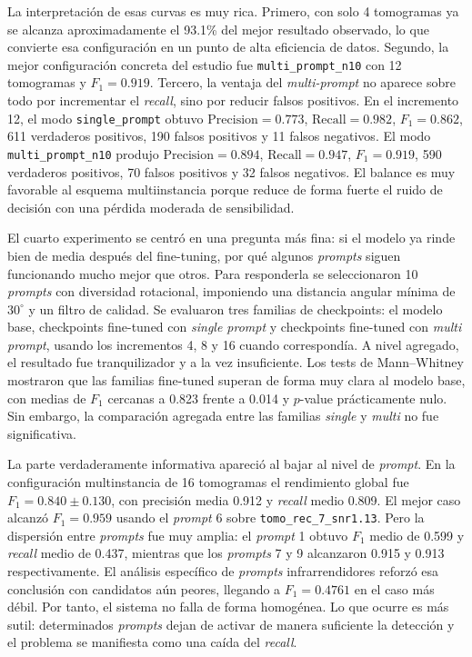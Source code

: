 \documentclass[12pt,a4paper]{report}
\begin{document}
La interpretación de esas curvas es muy rica. Primero, con solo 4 tomogramas ya se alcanza aproximadamente el 93.1\% del mejor resultado observado, lo que convierte esa configuración en un punto de alta eficiencia de datos. Segundo, la mejor configuración concreta del estudio fue \texttt{multi\_prompt\_n10} con 12 tomogramas y \(F_1=0.919\). Tercero, la ventaja del \emph{multi-prompt} no aparece sobre todo por incrementar el \emph{recall}, sino por reducir falsos positivos. En el incremento 12, el modo \texttt{single\_prompt} obtuvo \(\mathrm{Precision}=0.773\), \(\mathrm{Recall}=0.982\), \(F_1=0.862\), 611 verdaderos positivos, 190 falsos positivos y 11 falsos negativos. El modo \texttt{multi\_prompt\_n10} produjo \(\mathrm{Precision}=0.894\), \(\mathrm{Recall}=0.947\), \(F_1=0.919\), 590 verdaderos positivos, 70 falsos positivos y 32 falsos negativos. El balance es muy favorable al esquema multiinstancia porque reduce de forma fuerte el ruido de decisión con una pérdida moderada de sensibilidad.

El cuarto experimento se centró en una pregunta más fina: si el modelo ya rinde bien de media después del fine-tuning, por qué algunos \emph{prompts} siguen funcionando mucho mejor que otros. Para responderla se seleccionaron 10 \emph{prompts} con diversidad rotacional, imponiendo una distancia angular mínima de \(30^\circ\) y un filtro de calidad. Se evaluaron tres familias de checkpoints: el modelo base, checkpoints fine-tuned con \emph{single prompt} y checkpoints fine-tuned con \emph{multi prompt}, usando los incrementos 4, 8 y 16 cuando correspondía. A nivel agregado, el resultado fue tranquilizador y a la vez insuficiente. Los tests de Mann--Whitney mostraron que las familias fine-tuned superan de forma muy clara al modelo base, con medias de \(F_1\) cercanas a 0.823 frente a 0.014 y \(p\)-value prácticamente nulo. Sin embargo, la comparación agregada entre las familias \emph{single} y \emph{multi} no fue significativa.

La parte verdaderamente informativa apareció al bajar al nivel de \emph{prompt}. En la configuración multinstancia de 16 tomogramas el rendimiento global fue \(F_1=0.840 \pm 0.130\), con precisión media 0.912 y \emph{recall} medio 0.809. El mejor caso alcanzó \(F_1=0.959\) usando el \emph{prompt} 6 sobre \texttt{tomo\_rec\_7\_snr1.13}. Pero la dispersión entre \emph{prompts} fue muy amplia: el \emph{prompt} 1 obtuvo \(F_1\) medio de 0.599 y \emph{recall} medio de 0.437, mientras que los \emph{prompts} 7 y 9 alcanzaron 0.915 y 0.913 respectivamente. El análisis específico de \emph{prompts} infrarrendidores reforzó esa conclusión con candidatos aún peores, llegando a \(F_1=0.4761\) en el caso más débil. Por tanto, el sistema no falla de forma homogénea. Lo que ocurre es más sutil: determinados \emph{prompts} dejan de activar de manera suficiente la detección y el problema se manifiesta como una caída del \emph{recall}.
\end{document}

